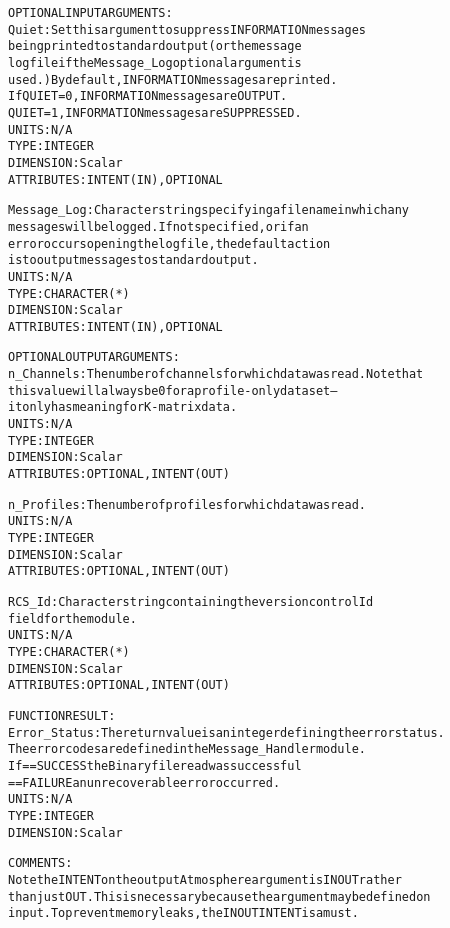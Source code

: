 \begin{alltt}
  OPTIONAL INPUT ARGUMENTS:
        Quiet:        Set this argument to suppress INFORMATION messages
                      being printed to standard output (or the message
                      log file if the Message_Log optional argument is
                      used.) By default, INFORMATION messages are printed.
                      If QUIET = 0, INFORMATION messages are OUTPUT.
                         QUIET = 1, INFORMATION messages are SUPPRESSED.
                      UNITS:      N/A
                      TYPE:       INTEGER
                      DIMENSION:  Scalar
                      ATTRIBUTES: INTENT(IN), OPTIONAL
 
        Message_Log:  Character string specifying a filename in which any
                      messages will be logged. If not specified, or if an
                      error occurs opening the log file, the default action
                      is to output messages to standard output.
                      UNITS:      N/A
                      TYPE:       CHARACTER(*)
                      DIMENSION:  Scalar
                      ATTRIBUTES: INTENT(IN), OPTIONAL
 
  OPTIONAL OUTPUT ARGUMENTS:
        n_Channels:   The number of channels for which data was read. Note that
                      this value will always be 0 for a profile-only dataset--
                      it only has meaning for K-matrix data.
                      UNITS:      N/A
                      TYPE:       INTEGER
                      DIMENSION:  Scalar
                      ATTRIBUTES: OPTIONAL, INTENT(OUT)
 
        n_Profiles:   The number of profiles for which data was read.
                      UNITS:      N/A
                      TYPE:       INTEGER
                      DIMENSION:  Scalar
                      ATTRIBUTES: OPTIONAL, INTENT(OUT)
 
        RCS_Id:       Character string containing the version control Id
                      field for the module.
                      UNITS:      N/A
                      TYPE:       CHARACTER(*)
                      DIMENSION:  Scalar
                      ATTRIBUTES: OPTIONAL, INTENT(OUT)
 
  FUNCTION RESULT:
        Error_Status: The return value is an integer defining the error status.
                      The error codes are defined in the Message_Handler module.
                      If == SUCCESS the Binary file read was successful
                         == FAILURE an unrecoverable error occurred.
                      UNITS:      N/A
                      TYPE:       INTEGER
                      DIMENSION:  Scalar
 
  COMMENTS:
        Note the INTENT on the output Atmosphere argument is IN OUT rather
        than just OUT. This is necessary because the argument may be defined on
        input. To prevent memory leaks, the IN OUT INTENT is a must.
 
  \end{alltt}
